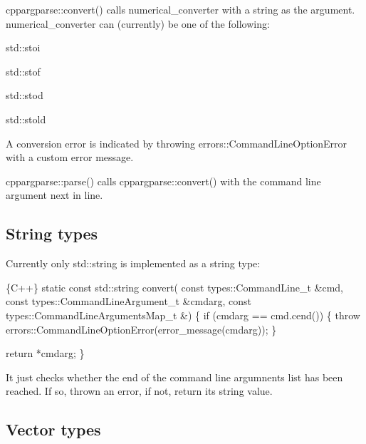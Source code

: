 {\ttfamily cppargparse\+::convert()} calls {\ttfamily numerical\+\_\+converter} with a string as the argument. {\ttfamily numerical\+\_\+converter} can (currently) be one of the following\+:
\begin{DoxyItemize}
\item {\ttfamily std\+::stoi}
\item {\ttfamily std\+::stof}
\item {\ttfamily std\+::stod}
\item {\ttfamily std\+::stold}
\end{DoxyItemize}

A conversion error is indicated by throwing {\ttfamily errors\+::\+Command\+Line\+Option\+Error} with a custom error message.

{\ttfamily cppargparse\+::parse()} calls {\ttfamily cppargparse\+::convert()} with the command line argument next in line.

\subsection*{String types}

Currently only {\ttfamily std\+::string} is implemented as a string type\+: 
\begin{DoxyCode}
\{C++\}
static const std::string convert(
        const types::CommandLine\_t &cmd,
        const types::CommandLineArgument\_t &cmdarg,
        const types::CommandLineArgumentsMap\_t &)
\{
    if (cmdarg == cmd.cend())
    \{
        throw errors::CommandLineOptionError(error\_message(cmdarg));
    \}

    return *cmdarg;
\}
\end{DoxyCode}


It just checks whether the end of the command line argumnents list has been reached. If so, thrown an error, if not, return its string value.

\subsection*{Vector types}


